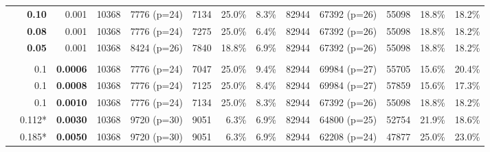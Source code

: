 \begin{table*}[p]
\begin{tabular}{l|rr|rrrrr|rrrrr}
    & \textbf{0.10} & 0.001  & 10368 & 7776 (p=24) & 7134 & 25.0\% & 8.3\% & 82944 & 67392 (p=26) & 55098 & 18.8\% & 18.2\% \\
    
    & \textbf{0.08} & 0.001  & 10368 & 7776 (p=24) & 7275 & 25.0\% & 6.4\% & 82944 & 67392 (p=26) & 55098 & 18.8\% & 18.2\% \\
    
    & \textbf{0.05} & 0.001  & 10368 & 8424 (p=26) & 7840 & 18.8\% & 6.9\% & 82944 & 67392 (p=26) & 55098 & 18.8\% & 18.2\% \\
    
    & & & & & & & & & & & &\\
    
    & 0.1 & \textbf{0.0006}  & 10368 & 7776 (p=24) & 7047 & 25.0\% & 9.4\% & 82944 & 69984 (p=27) & 55705 & 15.6\% & 20.4\% \\
    
    & 0.1 & \textbf{0.0008}  & 10368 & 7776 (p=24) & 7125 & 25.0\% & 8.4\% & 82944 & 69984 (p=27) & 57859 & 15.6\% & 17.3\% \\
    
    & 0.1 & \textbf{0.0010}  & 10368 & 7776 (p=24) & 7134 & 25.0\% & 8.3\% & 82944 & 67392 (p=26) & 55098 & 18.8\% & 18.2\% \\
    
    & 0.112* & \textbf{0.0030}  & 10368 &  9720 (p=30) & 9051 & 6.3\% & 6.9\% & 82944 & 64800 (p=25) & 52754 & 21.9\% & 18.6\% \\
    
    & 0.185* &\textbf{0.0050}  & 10368 & 9720 (p=30) & 9051 & 6.3\% & 6.9\% & 82944 & 62208 (p=24) & 47877 & 25.0\%& 23.0\% \\
    \bottomrule
  \end{tabular}
\end{table*}